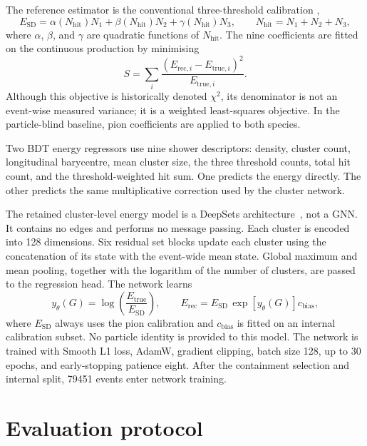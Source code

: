 \documentclass[11pt,a4paper]{article}
\newcommand{\Etrue}{\ensuremath{E_{\mathrm{true}}}}
\newcommand{\Erec}{\ensuremath{E_{\mathrm{rec}}}}
\newcommand{\Esd}{\ensuremath{E_{\mathrm{SD}}}}
\begin{document}
The reference estimator is the conventional three-threshold calibration
\cite{calice2016sdhcal},
\begin{equation}
  \Esd = \alpha(N_{\mathrm{hit}})N_1
        + \beta(N_{\mathrm{hit}})N_2
        + \gamma(N_{\mathrm{hit}})N_3,
  \qquad N_{\mathrm{hit}}=N_1+N_2+N_3,
  \label{eq:sd}
\end{equation}
where $\alpha$, $\beta$, and $\gamma$ are quadratic functions of $N_{\mathrm{hit}}$.
The nine coefficients are fitted on the continuous production by minimising
\begin{equation}
  S = \sum_i \frac{\left(E_{\mathrm{rec},i}-E_{\mathrm{true},i}\right)^2}
                         {E_{\mathrm{true},i}}.
  \label{eq:wls}
\end{equation}
Although this objective is historically denoted $\chi^2$, its denominator is not an
event-wise measured variance; it is a weighted least-squares objective. In the
particle-blind baseline, pion coefficients are applied to both species.

Two BDT energy regressors use nine shower descriptors: density, cluster count,
longitudinal barycentre, mean cluster size, the three threshold counts, total hit
count, and the threshold-weighted hit sum. One predicts the energy directly. The
other predicts the same multiplicative correction used by the cluster network.

The retained cluster-level energy model is a DeepSets architecture~\cite{deepsets2017},
not a GNN. It contains no edges and performs no message passing. Each cluster is
encoded into 128 dimensions. Six residual set blocks update each cluster using the
concatenation of its state with the event-wide mean state. Global maximum and mean
pooling, together with the logarithm of the number of clusters, are passed to the
regression head. The network learns
\begin{equation}
  y_\theta(G)=\log\left(\frac{\Etrue}{\Esd}\right),
  \qquad
  \Erec = \Esd\,\exp\!\left[y_\theta(G)\right]c_{\mathrm{bias}},
  \label{eq:ratio}
\end{equation}
where $\Esd$ always uses the pion calibration and $c_{\mathrm{bias}}$ is fitted on an
internal calibration subset. No particle identity is provided to this model. The
network is trained with Smooth L1 loss, AdamW, gradient clipping, batch size 128,
up to 30 epochs, and early-stopping patience eight. After the containment selection
and internal split, 79451 events enter network training.

\section{Evaluation protocol}
\label{sec:evaluation}
\end{document}
